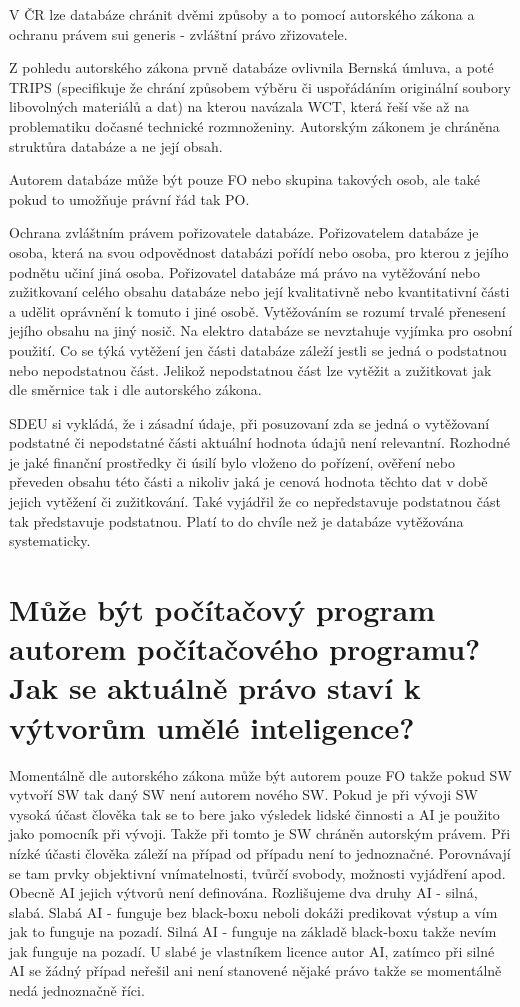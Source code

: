 V ČR lze databáze chránit dvěmi způsoby a to pomocí autorského zákona a ochranu právem sui generis - zvláštní právo zřizovatele.

Z pohledu autorského zákona prvně databáze ovlivnila Bernská úmluva, a poté TRIPS (specifikuje že chrání způsobem výběru či uspořádáním originální soubory libovolných materiálů a dat) na kterou navázala WCT, která řeší vše až na problematiku dočasné technické rozmnoženiny. Autorským zákonem je chráněna struktůra databáze a ne její obsah. 

Autorem databáze může být pouze FO nebo skupina takových osob, ale také pokud to umožňuje právní řád tak PO.

Ochrana zvláštním právem pořizovatele databáze. Pořizovatelem databáze je osoba, která na svou odpovědnost databázi pořídí nebo osoba, pro kterou z jejího podnětu učiní jiná osoba. Pořizovatel databáze má právo na vytěžování nebo zužitkovaní celého obsahu databáze nebo její kvalitativně nebo kvantitativní části a udělit oprávnění k tomuto i jiné osobě. Vytěžováním se rozumí trvalé přenesení jejího obsahu na jiný nosič. Na elektro databáze se nevztahuje vyjímka pro osobní použití. Co se týká vytěžení jen části databáze záleží jestli se jedná o podstatnou nebo nepodstatnou část. Jelikož nepodstatnou část lze vytěžit a zužitkovat jak dle směrnice tak i dle autorského zákona.

SDEU si vykládá, že i zásadní údaje, při posuzovaní zda se jedná o vytěžovaní podstatné či nepodstatné části aktuální hodnota údajů není relevantní. Rozhodné je jaké finanční prostředky či úsilí bylo vloženo do pořízení, ověření nebo převeden obsahu této části a nikoliv jaká je cenová hodnota těchto dat v době jejich vytěžení či zužitkování.
Také vyjádřil že co nepředstavuje podstatnou část tak představuje podstatnou. Platí to do chvíle než je databáze vytěžována systematicky.

\vspace{0.5cm} 
\section{Může být počítačový program autorem počítačového programu? Jak se aktuálně právo staví k výtvorům umělé inteligence?}

Momentálně dle autorského zákona může být autorem pouze FO takže pokud SW vytvoří SW tak daný SW není autorem nového SW. Pokud je při vývoji SW vysoká účast člověka tak se to bere jako výsledek lidské činnosti a AI je použito jako pomocník při vývoji. Takže při tomto je SW chráněn autorským právem. Při nízké účasti člověka záleží na případ od případu není to jednoznačné. Porovnávají se tam prvky objektivní vnímatelnosti, tvůrčí svobody, možnosti vyjádření apod. Obecně AI jejich výtvorů není definována. Rozlišujeme dva druhy AI - silná, slabá. Slabá AI - funguje bez black-boxu neboli dokáži predikovat výstup a vím jak to funguje na pozadí. Silná AI - funguje na základě black-boxu takže nevím jak funguje na pozadí. U slabé je vlastníkem licence autor AI, zatímco při silné AI se žádný případ neřešil ani není stanovené nějaké právo takže se momentálně nedá jednoznačně říci.

